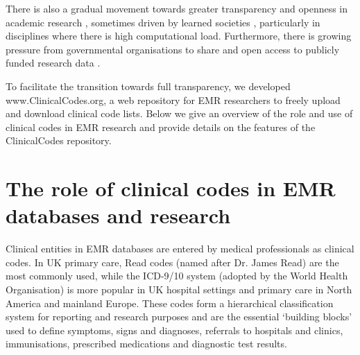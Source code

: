 \documentclass[10pt]{article}
\begin{document}
There is also a gradual movement towards greater transparency and openness in academic research \cite{Bechhofer2013, Stodden2013, Pampel2013}, sometimes driven by learned societies \cite{RoyalSoc2012}, particularly in disciplines where there is high computational load. Furthermore, there is growing pressure from governmental organisations to share and open access to publicly funded research data \cite{EuropeanCommission2012, OfficeSciTech2013}.

To facilitate the transition towards full transparency, we developed www.ClinicalCodes.org, a web repository for EMR researchers to freely upload and download clinical code lists.  Below we give an overview of the role and use of clinical codes in EMR research and provide details on the features of the ClinicalCodes repository.


\section*{The role of clinical codes in EMR databases and research}


Clinical entities in EMR databases are entered by medical professionals as clinical codes.  In UK primary care, Read codes (named after Dr. James Read) are the most commonly used, while the ICD-9/10 system (adopted by the World Health Organisation)  is more popular in UK hospital settings and primary care in North America and mainland Europe.  These codes form a hierarchical classification system for reporting and research purposes and are the essential `building blocks' used to define symptoms, signs and diagnoses, referrals to hospitals and clinics, immunisations, prescribed medications and diagnostic test results.
\end{document}
